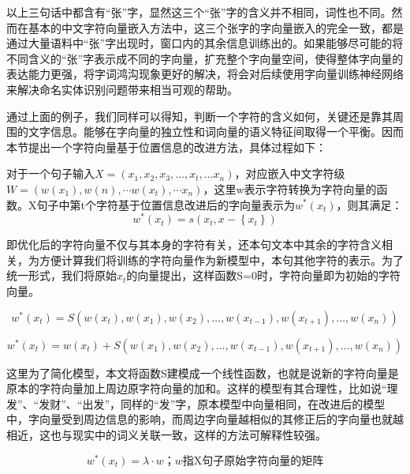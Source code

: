 \documentclass[winfonts,master,oneside,nobackinfo]{njuthesis}
\begin{document}
以上三句话中都含有“张”字，显然这三个“张”字的含义并不相同，词性也不同。然而在基本的中文字符向量嵌入方法中，这三个张字的字向量嵌入的完全一致，都是通过大量语料中“张”字出现时，窗口内的其余信息训练出的。如果能够尽可能的将不同含义的“张”字表示成不同的字向量，扩充整个字向量空间，使得整体字向量的表达能力更强，将字词鸿沟现象更好的解决，将会对后续使用字向量训练神经网络来解决命名实体识别问题带来相当可观的帮助。

通过上面的例子，我们同样可以得知，判断一个字符的含义如何，关键还是靠其周围的文字信息。能够在字向量的独立性和词向量的语义特征间取得一个平衡。因而本节提出一个字符向量基于位置信息的改进方法，具体过程如下：

对于一个句子输入$X=\left(x_{1}, x_{2}, x_{3},...,x_{t},... x_{n}\right)$，对应嵌入中文字符级$W=\left(w\left(x_{1}\right), w(n), \cdots w\left(x_{t}\right), \cdots x_{n}\right)$，这里w表示字符转换为字符向量的函数。X句子中第t个字符基于位置信息改进后的字向量表示为$w^{*}(x_{t})$，则其满足：
\begin{equation}
w^{*}\left(x_{t}\right)=s\left(x_{t}, x-\left\{x_{t}\right\}\right)
\end{equation}

即优化后的字符向量不仅与其本身的字符有关，还本句文本中其余的字符含义相关，为方便计算我们将训练的字符向量作为新模型中，本句其他字符的表示。为了统一形式，我们将原始$x_{t}$的向量提出，这样函数S=0时，字符向量即为初始的字符向量。

\begin{equation}
w^{*}\left(x_{t}\right)=S\left(w\left(x_{t}\right), w\left(x_{1}\right), w\left(x_{2}\right), \ldots, w\left(x_{t-1}\right), w\left(x_{t+1}\right), \ldots, w\left(x_{n}\right)\right)
\end{equation}

\begin{equation}
w^{*}\left(x_{t}\right)=w\left(x_{t}\right)+S\left( w\left(x_{1}\right), w\left(x_{2}\right), \ldots, w\left(x_{t-1}\right), w\left(x_{t+1}\right), \ldots, w\left(x_{n}\right)\right)
\end{equation}

这里为了简化模型，本文将函数S建模成一个线性函数，也就是说新的字符向量是原本的字符向量加上周边原字符向量的加和。这样的模型有其合理性，比如说“理发”、“发财”、“出发”，同样的“发”字，原本模型中向量相同，在改进后的模型中，字向量受到周边信息的影响，而周边字向量越相似的其修正后的字向量也就越相近，这也与现实中的词义关联一致，这样的方法可解释性较强。

\begin{equation}
w^{*}\left(x_{t}\right)=\lambda \cdot w \mbox{；} w \mbox{指X句子原始字符向量的矩阵}
\end{equation}
\end{document}
